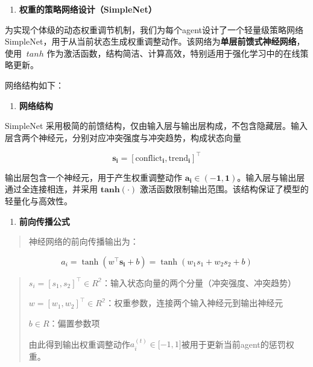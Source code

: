 \documentclass[12pt]{ctexart}
\begin{document}
\begin{enumerate}
\def\labelenumi{(\arabic{enumi})}
\item
  \textbf{权重的策略网络设计（SimpleNet）}
\end{enumerate}

为实现个体级的动态权重调节机制，我们为每个agent设计了一个轻量级策略网络
SimpleNet，用于从当前状态生成权重调整动作。该网络为\textbf{单层前馈式神经网络}，使用
\(\ tanh\)
作为激活函数，结构简洁、计算高效，特别适用于强化学习中的在线策略更新。

网络结构如下：

\begin{enumerate}
\def\labelenumi{\alph{enumi})}
\item
  \textbf{网络结构}
\end{enumerate}

SimpleNet
采用极简的前馈结构，仅由输入层与输出层构成，不包含隐藏层。输入层含两个神经元，分别对应冲突强度与冲突趋势，构成状态向量

\[\mathbf{s}_{\mathbf{i}} = \left\lbrack \text{conflict}_{\mathbf{i}},\text{trend}_{\mathbf{i}} \right\rbrack^{\top}\]

输出层包含一个神经元，用于产生权重调整动作
\(\mathbf{a}_{\mathbf{i}} \in \left( - \mathbf{1},\mathbf{1} \right)\)。输入层与输出层通过全连接相连，并采用
\(\mathbf{t}\mathbf{an}\mathbf{h}( \cdot )\)
激活函数限制输出范围。该结构保证了模型的轻量化与高效性。

\begin{enumerate}
\def\labelenumi{\alph{enumi})}
\setcounter{enumi}{1}
\item
  \textbf{前向传播公式}
\end{enumerate}

\begin{quote}
神经网络的前向传播输出为：
\end{quote}

\[a_{i} = \tanh\left( w^{\top}\mathbf{s}_{\mathbf{i}} + b \right) = \tanh\left( w_{1}s_{1} + w_{2}s_{2} + b \right)\]

\begin{quote}
\(s_{i} = \left\lbrack s_{1},s_{2} \right\rbrack^{\top} \in R^{\mathbb{2}}\)：输入状态向量的两个分量（冲突强度、冲突趋势）

\(w = \left\lbrack w_{1},w_{2} \right\rbrack^{\top} \in R^{\mathbb{2}}\)：权重参数，连接两个输入神经元到输出神经元

\(b \in R\)：偏置参数项

由此得到输出权重调整动作\(a_{i}^{(t)} \in \lbrack - 1,1\rbrack\)被用于更新当前agent的惩罚权重。
\end{quote}
\end{document}
